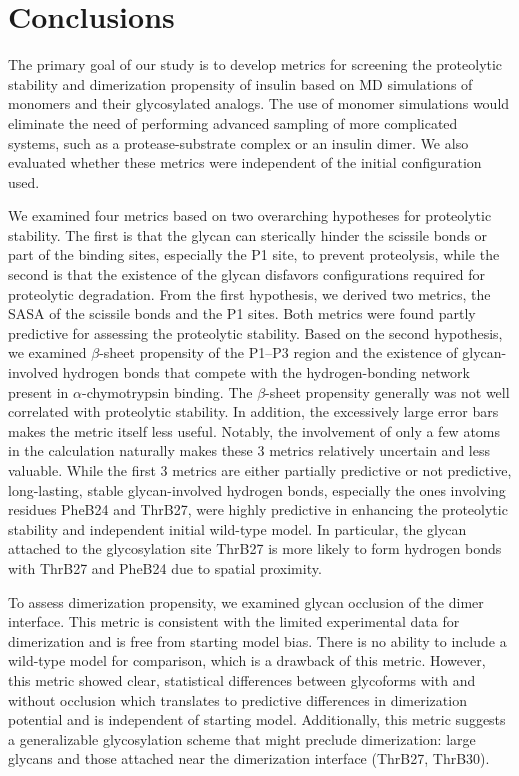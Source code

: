 \documentclass[sn-vancouver]{sn-jnl}
\begin{document}
\section{Conclusions}
The primary goal of our study is to develop metrics for screening the proteolytic stability and dimerization propensity of insulin based on MD simulations of monomers and their glycosylated analogs. The use of monomer simulations would eliminate the need of performing advanced sampling of more complicated systems, such as a protease-substrate complex or an insulin dimer. We also evaluated whether these metrics were independent of the initial configuration used. 

We examined four metrics based on two overarching hypotheses for proteolytic stability. The first is that the glycan can sterically hinder the scissile bonds or part of the binding sites, especially the P1 site, to prevent proteolysis, while the second is that the existence of the glycan disfavors configurations required for proteolytic degradation. From the first hypothesis, we derived two metrics, the SASA of the scissile bonds and the P1 sites. Both metrics were found partly predictive for assessing the proteolytic stability. Based on the second hypothesis, we examined $\beta$-sheet propensity of the P1--P3 region and the existence of glycan-involved hydrogen bonds that compete with the hydrogen-bonding network present in $\alpha$-chymotrypsin binding. The $\beta$-sheet propensity generally was not well correlated with proteolytic stability. In addition, the excessively large error bars makes the metric itself less useful. Notably, the involvement of only a few atoms in the calculation naturally makes these 3 metrics relatively uncertain and less valuable. While the first 3 metrics are either partially predictive or not predictive, long-lasting, stable glycan-involved hydrogen bonds, especially the ones involving residues PheB24 and ThrB27, were highly predictive in enhancing the proteolytic stability and independent initial wild-type model. In particular, the glycan attached to the glycosylation site ThrB27 is more likely to form hydrogen bonds with ThrB27 and PheB24 due to spatial proximity.

To assess dimerization propensity, we examined glycan occlusion of the dimer interface. This metric is consistent with the limited experimental data for dimerization and is free from starting model bias. There is no ability to include a wild-type model for comparison, which is a drawback of this metric. However, this metric showed clear, statistical differences between glycoforms with and without occlusion which translates to predictive differences in dimerization potential and is independent of starting model. Additionally, this metric suggests a generalizable glycosylation scheme that might preclude dimerization: large glycans and those attached near the dimerization interface (ThrB27, ThrB30). 
\end{document}
